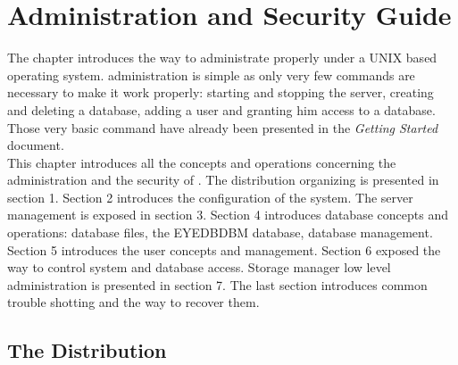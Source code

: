 

\newcommand{\mantitle}{\textsc{Administration}}


\tableofcontents

\chapter{Administration and Security Guide}

The chapter introduces the way to administrate properly \eyedb under
a UNIX based operating system.
\eyedb administration is simple as only very few commands are necessary to
make it work properly: starting and stopping the server, creating and deleting
a database, adding a user and granting him access to a database.
Those very basic command have already been presented in the
\emph{Getting Started} document.
\\
This chapter introduces all the concepts and operations concerning
the administration and the security of \eyedbX.
The distribution organizing is presented in section 1. Section 2
introduces the configuration of the system.
The server management is exposed in section 3.
Section 4 introduces database concepts and operations:
database files, the EYEDBDBM database, database management.
Section 5 introduces the \eyedb user concepts and management.
Section 6 exposed the way to control system and database access.
Storage manager low level administration is presented in section 7.
The last section introduces common trouble shotting and the
way to recover them.

\newcommand{\tdir}{\emph{topdir}}
\newcommand{\constvar}{The value of this variable cannot be changed}
\newcommand{\modvar}{The value of this variable can be modified}
\newcommand{\esc}[1]{\ttv{$\backslash$#1}}

\section{The Distribution}
